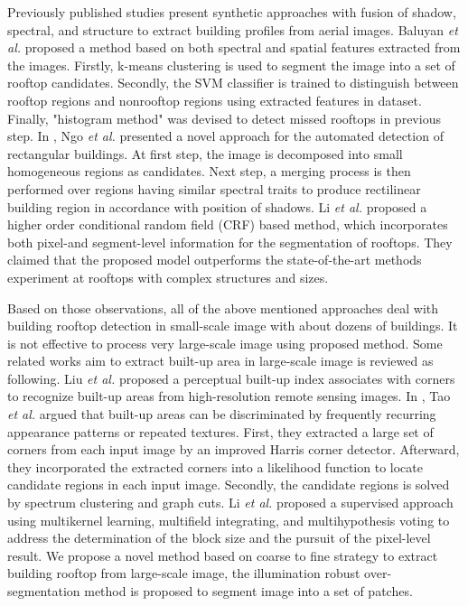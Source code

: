 	Previously published studies present synthetic approaches with fusion of shadow, spectral, and structure to extract building profiles from aerial images. Baluyan \textit{et al.} \cite{baluyan2013novel} proposed a method based on both spectral and spatial features extracted from the images. Firstly, k-means clustering is used to segment the image into a set of rooftop candidates. Secondly, the SVM classifier is trained to distinguish between rooftop regions and nonrooftop regions using extracted features in dataset. Finally, "histogram method" was devised to detect missed rooftops in previous step. In \cite{ngoautomatic}, Ngo \textit{et al.} presented a novel approach for the automated detection of rectangular buildings. At first step, the image is decomposed into small homogeneous regions as candidates. Next step, a merging process is then performed over regions having similar spectral traits to produce rectilinear building region in accordance with position of shadows. Li \textit{et al.} \cite{li2015robust} proposed a higher order conditional random field (CRF) based method, which incorporates both pixel-and segment-level information for the segmentation of rooftops. They claimed that the proposed model outperforms the state-of-the-art methods experiment at rooftops with complex structures and sizes. 	
	
	Based on those observations, all of the  above mentioned approaches deal with building rooftop detection in small-scale image with about dozens of buildings. It is not effective to process very large-scale image using proposed method. Some related works aim to extract built-up area in large-scale image is reviewed as following. Liu \textit{et al.} \cite{liu2013perception} proposed a perceptual built-up index associates with corners to recognize built-up areas from high-resolution remote sensing images. In \cite{tao2013unsupervised},
Tao  \textit{et al.} argued that built-up areas can be discriminated by frequently recurring appearance patterns or repeated textures. 
 First, they extracted a large set of corners from each input image by an improved Harris corner detector. Afterward, they incorporated the extracted corners into a likelihood function to locate candidate regions in each input image. Secondly, the candidate regions is solved by spectrum clustering and graph cuts. Li \textit{et al.} \cite{li2015built} proposed a supervised approach using multikernel learning, multifield integrating, and multihypothesis voting to address the determination of the block size and the pursuit of the pixel-level result. We propose a novel method based on coarse to fine strategy to extract building rooftop from large-scale image, the  illumination robust over-segmentation method is proposed to segment image into a set of patches. 
	
	

